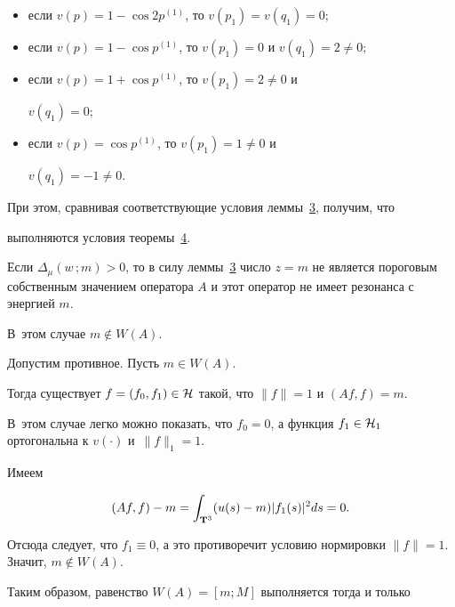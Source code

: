 \begin{itemize}

\item [1)] если $v(p)=1-\cos 2p^{(1)}$, то $v(p_1)=v(q_1)=0;$



\item [2)] если $v(p)=1-\cos p^{(1)}$, то $v(p_1)=0$ и $v(q_1)=2

\neq 0;$



\item [3)] если $v(p)=1+\cos p^{(1)}$, то $v(p_1)=2 \neq 0$ и

$v(q_1)=0;$



\item [4)] если $v(p)=\cos p^{(1)}$, то $v(p_1)=1 \neq 0$ и

$v(q_1)=-1 \neq 0$.



\end{itemize}



При этом, сравнивая соответствующие условия леммы~\hyperlink{RD:lemma3}{3}, получим, что

выполняются условия теоремы~\hyperlink{RD:th4}{4}.



Если $\Delta_\mu(w\,; m)>0$, то в силу леммы~\hyperlink{RD:lemma3}{3} число $z=m$ не является пороговым собственным значением оператора $A$ и этот оператор не имеет резонанса с энергией $m$. 

В~этом случае $m \not\in W(A)$. 

Допустим противное. Пусть $m \in W(A)$. 

Тогда существует $f=(f_0, f_1) \in {\cal H}$ такой, что $\|f\|=1$ и $(Af,f)=m$. 

В~этом случае легко можно показать, что $f_0=0$, а функция $f_1 \in {\cal H}_1$ ортогональна к $v(\cdot)$ и~$\|f\|_1=1$. 

Имеем

$$

(Af,f)-m=\int _{{\bf T}^3} (u(s)-m)|f_1(s)|^2ds=0.

$$

Отсюда следует, что $f_1 \equiv 0$, а это противоречит условию нормировки $\|f\|=1$. Значит, $m \not\in W(A)$.



Таким образом, равенство $W(A)=[m; M]$ выполняется тогда и только

